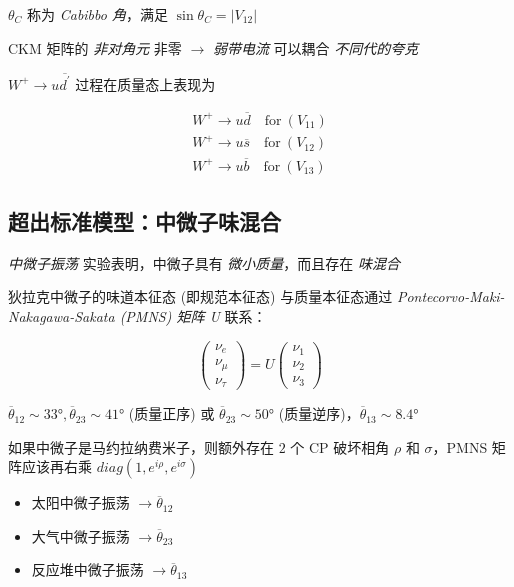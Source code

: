 $\theta_C$ 称为 \emph{Cabibbo 角}，满足 $\sin \theta_C = |V_{12}|$

CKM 矩阵的 \emph{非对角元} 非零 $\to$ \emph{弱带电流} 可以耦合 \emph{不同代的夸克}

$W^+ \to u \overline{d^\prime}$ 过程在质量态上表现为

\begin{align}
    W^+ \to u \overline{d} \quad \text{for}\ (V_{11})\\
    W^+ \to u \overline{s} \quad \text{for}\ (V_{12})\\
    W^+ \to u \overline{b} \quad \text{for}\ (V_{13})
\end{align}

\subsection{超出标准模型：中微子味混合}

\emph{中微子振荡} 实验表明，中微子具有 \emph{微小质量}，而且存在 \emph{味混合}

狄拉克中微子的味道本征态 (即规范本征态) 与质量本征态通过 \emph{Pontecorvo-Maki-Nakagawa-Sakata (PMNS) 矩阵 U} 联系：

\begin{equation}
    \begin{pmatrix}
        \nu_e \\
        \nu_\mu \\
        \nu_\tau
    \end{pmatrix} = U
    \begin{pmatrix}
        \nu_1 \\
        \nu_2 \\
        \nu_3
    \end{pmatrix}
\end{equation}

$\overline{\theta}_{12} \sim \ang{33}, \overline{\theta}_{23} \sim \ang{41}$ (质量正序) 或 $\overline{\theta}_{23} \sim \ang{50}$ (质量逆序)，$\overline{\theta}_{13} \sim \ang{8.4}$

如果中微子是马约拉纳费米子，则额外存在 $2$ 个 CP 破坏相角 $\rho$ 和 $\sigma$，PMNS 矩阵应该再右乘 $diag(1, e^{i\rho}, e^{i\sigma})$

\begin{itemize}
    \item 太阳中微子振荡 $\to \overline{\theta}_{12}$
    \item 大气中微子振荡 $\to \overline{\theta}_{23}$
    \item 反应堆中微子振荡 $\to \overline{\theta}_{13}$
\end{itemize}

